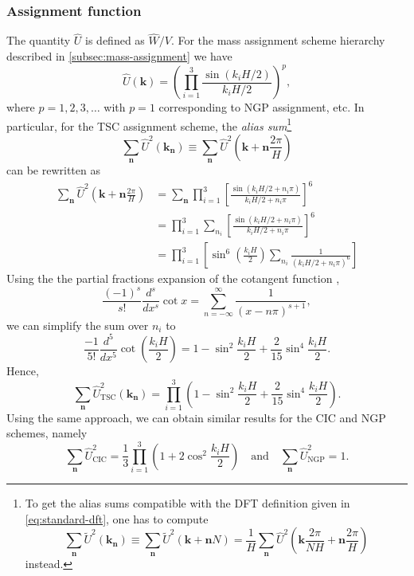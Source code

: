 \subsubsection{Assignment function}
The quantity $\hat{U}$ is defined as $\hat{W}/V$.
For the mass assignment scheme hierarchy described in \autoref{subsec:mass-assignment} we have
\begin{equation*}
    \hat{U}(\mathbf{k}) = \left(\prod_{i=1}^{3}\frac{\sin(k_i H / 2)}{k_i H / 2}\right)^{p},
\end{equation*}
where $p=1,2,3,\dots$ with $p=1$ corresponding to NGP assignment, etc.
In particular, for the TSC assignment scheme, the \textit{alias sum}\footnote{
    To get the alias sums compatible with the DFT definition given in \autoref{eq:standard-dft}, one has to compute
    \begin{equation*}
        \sum_{\mathbf{n}} \tilde{U}^2(\mathbf{k}_\mathbf{n})
        \equiv \sum_\mathbf{n}\tilde{U}^2(\mathbf{k}+\mathbf{n}N)
        = \frac{1}{H}\sum_\mathbf{n}\hat{U}^2\left(\mathbf{k}\frac{2\pi}{NH}+\mathbf{n}\frac{2\pi}{H}\right)
    \end{equation*}
    instead.
}
\begin{equation*}
    \sum_{\mathbf{n}}\hat{U}^2(\mathbf{k}_\mathbf{n})
    \equiv \sum_{\mathbf{n}}\hat{U}^2\left(\mathbf{k} + \mathbf{n}\frac{2\pi}{H}\right)
\end{equation*}
can be rewritten as
\begin{align*}
    \sum_{\mathbf{n}} \hat{U}^2\left(\mathbf{k}+\mathbf{n}\frac{2\pi}{H}\right)
     & = \sum_{\mathbf{n}} \prod_{i=1}^{3} \left[ \frac{\sin(k_i H/2 + n_i\pi)}{k_i H/2 + n_i\pi} \right]^6 \\
     & = \prod_{i=1}^{3} \sum_{n_i} \left[ \frac{\sin(k_i H/2 + n_i \pi)}{k_i H/2 + n_i \pi} \right]^6      \\
     & = \prod_{i=1}^{3} \left[ \sin^6\left(\frac{k_i H}{2}\right)
        \sum_{n_i} \frac{1}{(k_i H/2 + n_i \pi)^6} \right]
\end{align*}
Using the the partial fractions expansion of the cotangent function \cite{aigner2018proofs},
\begin{equation*}
    \frac{(-1)^s}{s!}\frac{d^s}{dx^s}\cot x = \sum_{n=-\infty}^{\infty} \frac{1}{(x-n\pi)^{s+1}},
\end{equation*}
we can simplify the sum over $n_i$ to
\begin{equation*}
    \frac{-1}{5!} \frac{d^5}{dx^5}\cot\left( \frac{k_i H}{2} \right)
    = 1 - \sin^2\frac{k_i H}{2} + \frac{2}{15}\sin^4\frac{k_i H}{2}.
\end{equation*}
Hence,
\begin{equation*}
    \sum_{\mathbf{n}}\hat{U}_\text{TSC}^2(\mathbf{k}_\mathbf{n})
    = \prod_{i=1}^{3} \left(1 - \sin^2\frac{k_i H}{2} + \frac{2}{15}\sin^4\frac{k_i H}{2}\right).
\end{equation*}
Using the same approach, we can obtain similar results for the CIC and NGP schemes, namely
\begin{equation*}
    \sum_{\mathbf{n}}\hat{U}_\text{CIC}^2 = \frac{1}{3} \prod_{i=1}^{3} \left(1 + 2\cos^2\frac{k_i H}{2}\right)
    \quad \text{and} \quad
    \sum_{\mathbf{n}}\hat{U}_\text{NGP}^2 = 1.
\end{equation*}

